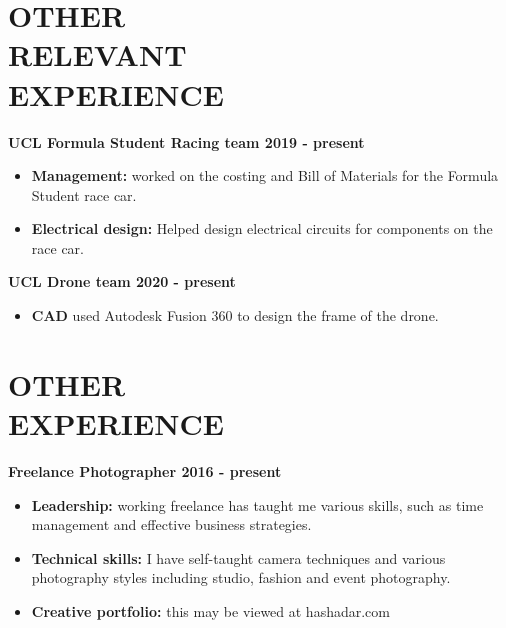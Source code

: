 \documentclass[margin, 10pt]{res} %
\begin{document}
\begin{resume}

\section{OTHER \\RELEVANT \\EXPERIENCE} 

\textbf{UCL Formula Student Racing team \hfill 2019 - present}
\\
\begin{itemize}
  \item \textbf{Management:} worked on the costing and Bill of Materials for the Formula Student race car.
  \item \textbf{Electrical design:} Helped design electrical circuits for components on the race car.
\end{itemize}

\textbf{UCL Drone team \hfill 2020 - present}
\\
\begin{itemize}
  \item \textbf{CAD} used Autodesk Fusion 360 to design the frame of the drone.
\end{itemize}
 
 
\section{OTHER \\ EXPERIENCE}
\textbf{Freelance Photographer \hfill 2016 - present}
\\
\begin{itemize}
  \item \textbf{Leadership:} working freelance has taught me various skills, such as time management and effective business strategies.
  \item \textbf{Technical skills:} I have self-taught camera techniques and various photography styles including studio, fashion and event photography.
  \item \textbf{Creative portfolio:} this may be viewed at hashadar.com
\end{itemize}


\end{resume}
\end{document}
